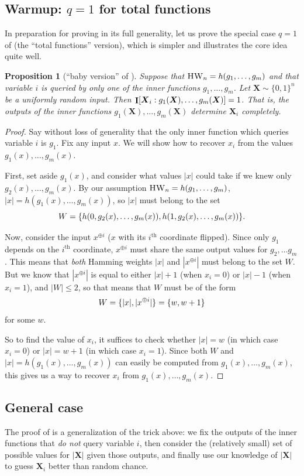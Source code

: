 \documentclass[10pt,a4paper]{article}
\newtheorem{proposition}[lemma]{Proposition}
\theoremstyle{definition}
\theoremstyle{remark}
\renewcommand{\th}{^{\mathrm{th}}}
\newcommand{\mathsc}[1]{{\normalfont\textsc{#1}}}
\DeclarePairedDelimiter{\set}{\{}{\}}
\DeclarePairedDelimiter{\sqb}{[}{]}
\DeclareMathOperator{\I}{\mathbf{I}}
\DeclareMathOperator{\HW}{\mathsc{HW}}
\newcommand{\bX}{\boldsymbol{X}}
\begin{document}
\subsection{Warmup: $q=1$ for total functions}
In preparation for proving  in its full generality, let us prove the special case $q=1$ of  (the ``total functions'' version), which is simpler and illustrates the core idea quite well.
\begin{proposition}[``baby version'' of ]
Suppose that $\HW_n = h(g_1, \ldots, g_m)$ and that variable $i$ is queried by only one of the inner functions $g_1, \ldots, g_m$.
Let $\bX \sim \{0,1\}^n$ be a uniformly random input.
Then $\I\sqb{\bX_i:g_1(\bX), \ldots, g_m(\bX)} = 1$.
That is, the outputs of the inner functions $g_1(\bX), \ldots, g_m(\bX)$ determine $\bX_i$ completely.
\end{proposition}
\begin{proof}
Say without loss of generality that the only inner function which queries variable $i$ is $g_1$.
Fix any input $x$.
We will show how to recover $x_i$ from the values $g_1(x),\ldots, g_m(x)$.

First, set aside $g_1(x)$, and consider what values $|x|$ could take if we knew only $g_2(x), \ldots, g_m(x)$.
By our assumption $\HW_n = h(g_1, \ldots, g_m)$, $|x| = h(g_1(x), \ldots, g_m(x))$, so $|x|$ must belong to the set
\[
W = \set{h(0, g_2(x), \ldots, g_m(x)), h(1, g_2(x), \ldots, g_m(x))}.
\]

Now, consider the input $x^{\oplus i}$ ($x$ with its $i\th$ coordinate flipped).
Since only $g_1$ depends on the $i\th$ coordinate, $x^{\oplus i}$ must share the same output values for $g_2, \ldots g_m$.
This means that \emph{both} Hamming weights $|x|$ and $|x^{\oplus i}|$ must belong to the set $W$.
But we know that $|x^{\oplus i}|$ is equal to either $|x| + 1$ (when $x_i = 0$) or $|x| - 1$ (when $x_i = 1$), and $|W| \leq 2$, so that means that $W$ must be of the form
\[
W = \set{|x|, |x^{\oplus i}|} = \set{w, w+1}
\]
for some $w$.

So to find the value of $x_i$, it suffices to check whether $|x| = w$ (in which case $x_i = 0$) or $|x| = w+1$ (in which case $x_i = 1$).
Since both $W$ and $|x| = h(g_1(x), \ldots, g_m(x))$ can easily be computed from $g_1(x), \ldots, g_m(x)$, this gives us a way to recover $x_i$ from $g_1(x), \ldots, g_m(x)$.
\end{proof}

\subsection{General case}
The proof of  is a generalization of the trick above: we fix the outputs of the inner functions that \emph{do not} query variable $i$,
then consider the (relatively small) set of possible values for $|\bX|$ given those outputs, and finally use our knowledge of $|\bX|$ to guess $\bX_i$ better than random chance.
\end{document}

